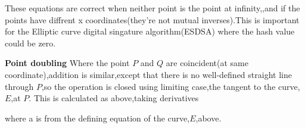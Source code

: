 \documentclass{article}
\begin{document}
These equations are correct when neither point is the point at infinity,{},and if the points have diffrent x coordinates(they're not mutual inverses).This is important for the Elliptic curve digital singature algorithm(ESDSA) where the hash value could be zero.

\textbf{Point doubling}
\newline
Where the point $P$ and $Q$ are coincident(at same coordinate),addition is similar,except that there is no well-defined straight line through $P$,so the operation is closed using limiting case,the tangent to the curve,$E$,at $P$.
This is calculated as above,taking derivatives
\begin{center}
\end{center}
\begin{center}
\end{center}
where a is from the defining equation of the curve,$E$,above.
\end{document}
